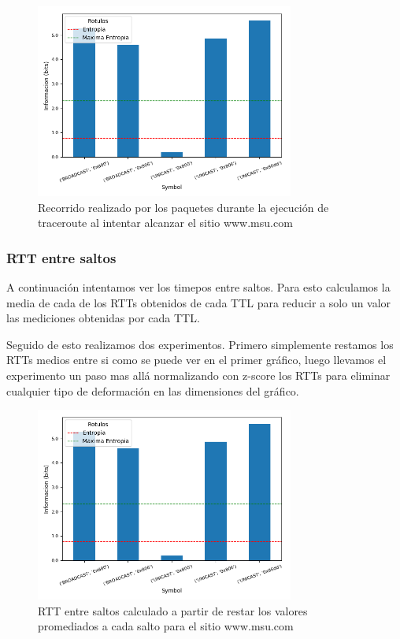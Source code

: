 \begin{figure}[H]
  \centering
  \includegraphics[width=8.5cm]{figs/information_hogar_ethernet_S1_output.png}
  \caption{\normalfont Recorrido realizado por los paquetes durante la ejecución de traceroute al intentar alcanzar el sitio www.msu.com}
\end{figure}

\subsubsection*{RTT entre saltos}

A continuación intentamos ver los timepos entre saltos. Para esto calculamos la media de cada de los RTTs obtenidos de cada TTL para reducir a solo un valor las mediciones obtenidas por cada TTL. 

Seguido de esto realizamos dos experimentos. Primero simplemente restamos los RTTs medios entre si como se puede ver en el primer gráfico, luego llevamos el experimento un paso mas allá normalizando con z-score los RTTs para eliminar cualquier tipo de deformación en las dimensiones del gráfico.

\begin{figure}[H]
  \centering
  \includegraphics[width=8.5cm]{figs/information_hogar_ethernet_S1_output.png}
  \caption{\normalfont RTT entre saltos calculado a partir de restar los valores promediados a cada salto para el sitio www.msu.com}
\end{figure}


